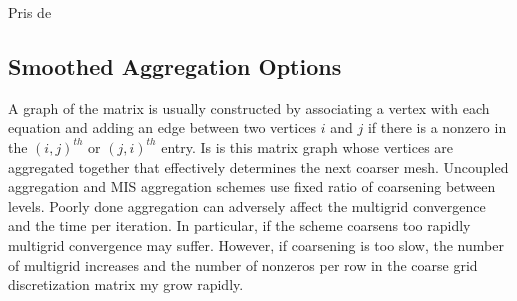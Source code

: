 Pris de \cite{ml-guide}\\
\subsection{Smoothed Aggregation Options}
A graph of the matrix is usually constructed by associating a vertex with each
equation and adding an edge between two vertices $i$ and $j$ if there is a
nonzero in the $(i,j)^{th}$ or $(j,i)^{th}$ entry. Is is this matrix graph
whose vertices are aggregated together that effectively determines the next
coarser mesh. Uncoupled aggregation and MIS aggregation schemes use fixed
ratio of coarsening between levels. Poorly done aggregation can adversely
affect the multigrid convergence and the time per iteration. In particular, if
the scheme coarsens too rapidly multigrid convergence may suffer. However, if
coarsening is too slow, the number of multigrid increases and the number of
nonzeros per row in the coarse grid discretization matrix my grow rapidly. 

